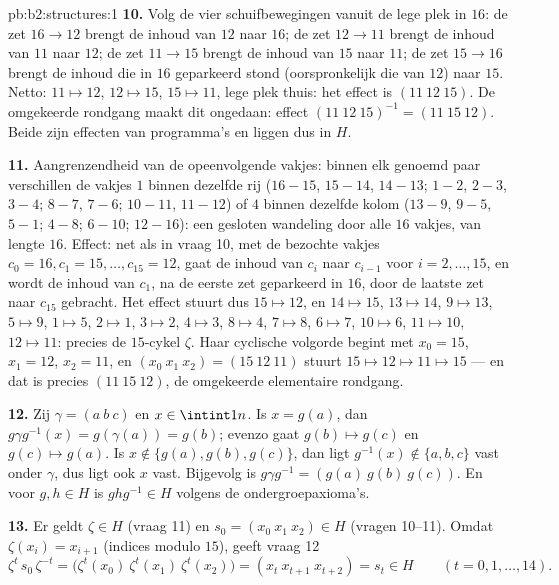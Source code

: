 \begin{solution}{pb:b2:structures:1}
\textbf{10.} Volg de vier schuifbewegingen vanuit de lege plek in
$16$: de zet $16 \to 12$ brengt de inhoud van $12$ naar $16$; de
zet $12 \to 11$ brengt de inhoud van $11$ naar $12$; de zet $11
\to 15$ brengt de inhoud van $15$ naar $11$; de zet $15 \to 16$
brengt de inhoud die in $16$ geparkeerd stond (oorspronkelijk die
van $12$) naar $15$. Netto: $11 \mapsto 12$, $12 \mapsto 15$, $15
\mapsto 11$, lege plek thuis: het effect is $(11\ 12\ 15)$. De
omgekeerde rondgang maakt dit ongedaan: effect $(11\ 12\
15)^{-1} = (11\ 15\ 12)$. Beide zijn effecten van programma's en
liggen dus in $H$.

\textbf{11.} Aangrenzendheid van de opeenvolgende vakjes: binnen
elk genoemd paar verschillen de vakjes $1$ binnen dezelfde rij
($16{-}15$, $15{-}14$, $14{-}13$; $1{-}2$, $2{-}3$, $3{-}4$;
$8{-}7$, $7{-}6$; $10{-}11$, $11{-}12$) of $4$ binnen dezelfde
kolom ($13{-}9$, $9{-}5$, $5{-}1$; $4{-}8$; $6{-}10$; $12{-}16$):
een gesloten wandeling door alle $16$ vakjes, van lengte $16$.
Effect: net als in vraag 10, met de bezochte vakjes $c_0 = 16, c_1
= 15, \dots, c_{15} = 12$, gaat de inhoud van $c_i$ naar $c_{i-1}$
voor $i = 2, \dots, 15$, en wordt de inhoud van $c_1$, na de
eerste zet geparkeerd in $16$, door de laatste zet naar $c_{15}$
gebracht. Het effect stuurt dus $15 \mapsto 12$, en $14 \mapsto
15$, $13 \mapsto 14$, $9 \mapsto 13$, $5 \mapsto 9$, $1 \mapsto
5$, $2 \mapsto 1$, $3 \mapsto 2$, $4 \mapsto 3$, $8 \mapsto 4$, $7
\mapsto 8$, $6 \mapsto 7$, $10 \mapsto 6$, $11 \mapsto 10$, $12
\mapsto 11$: precies de $15$-cykel $\zeta$. Haar cyclische
volgorde begint met $x_0 = 15$, $x_1 = 12$, $x_2 = 11$, en $(x_0\
x_1\ x_2) = (15\ 12\ 11)$ stuurt $15 \mapsto 12 \mapsto 11 \mapsto
15$ --- en dat is precies $(11\ 15\ 12)$, de omgekeerde
elementaire rondgang.

\textbf{12.} Zij $\gamma = (a\ b\ c)$ en $x \in \intint1n$. Is $x
= g(a)$, dan $g\gamma g^{-1}(x) = g(\gamma(a)) = g(b)$; evenzo
gaat $g(b) \mapsto g(c)$ en $g(c) \mapsto g(a)$. Is $x \notin
\{g(a), g(b), g(c)\}$, dan ligt $g^{-1}(x) \notin \{a,b,c\}$ vast
onder $\gamma$, dus ligt ook $x$ vast. Bijgevolg is $g\gamma
g^{-1} = (g(a)\ g(b)\ g(c))$. En voor $g, h \in H$ is $ghg^{-1}
\in H$ volgens de ondergroepaxioma's.

\textbf{13.} Er geldt $\zeta \in H$ (vraag 11) en $s_0 = (x_0\ x_1\
x_2) \in H$ (vragen 10--11). Omdat $\zeta(x_i) = x_{i+1}$ (indices
modulo $15$), geeft vraag 12
\[
\zeta^{t}\,s_0\,\zeta^{-t}
= \bigl(\zeta^t(x_0)\ \zeta^t(x_1)\ \zeta^t(x_2)\bigr)
= (x_t\ x_{t+1}\ x_{t+2}) = s_t \in H
\qquad (t = 0, 1, \dots, 14).
\]


\end{solution}
